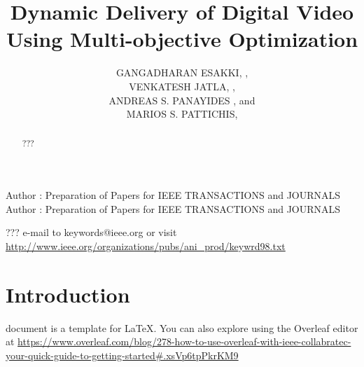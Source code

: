 \documentclass{ieeeaccess}
\begin{document}

\title{Dynamic Delivery of Digital Video Using Multi-objective Optimization}
\author{
\uppercase{Gangadharan Esakki},      , \\
\uppercase{Venkatesh Jatla},          ,  \\
\uppercase{Andreas S. Panayides} , and \\
\uppercase{Marios S. Pattichis},     }
\address[1]{
Image and Video Processing and Communications Lab 
Department of Electrical and Computer Engineering 
The University of New Mexico
Albuquerque, New Mexico, NM 87131 USA
(e-mails: , pattichi)}
\address[2]{SiGiNT Solutions Ltd, 2311 Nicosia, Cyprus (e-mail: a.panayides@sigintsolutions.com)}
\address[3]{Department of Computer Science, University of Cyprus, 1678 Nicosia, Cyprus (e-mail: panayides@cs.ucy.ac.cy)}

\markboth
{Author \headeretal: Preparation of Papers for IEEE TRANSACTIONS and JOURNALS}
{Author \headeretal: Preparation of Papers for IEEE TRANSACTIONS and JOURNALS}


\begin{abstract}
???
\end{abstract}

\begin{keywords}
???
e-mail to keywords@ieee.org or visit \underline
{http://www.ieee.org/organizations/pubs/ani\_prod/keywrd98.txt}
\end{keywords}

\titlepgskip=-15pt

\maketitle

\section{Introduction}
\label{sec:introduction}
 document is a template for \LaTeX. 
You can also explore using the Overleaf editor at 
\underline
{https://www.overleaf.com/blog/278-how-to-use-overleaf-}\break\underline{with-ieee-collabratec-your-quick-guide-to-getting-started}\break\underline{\#.xsVp6tpPkrKM9}
\end{document}
